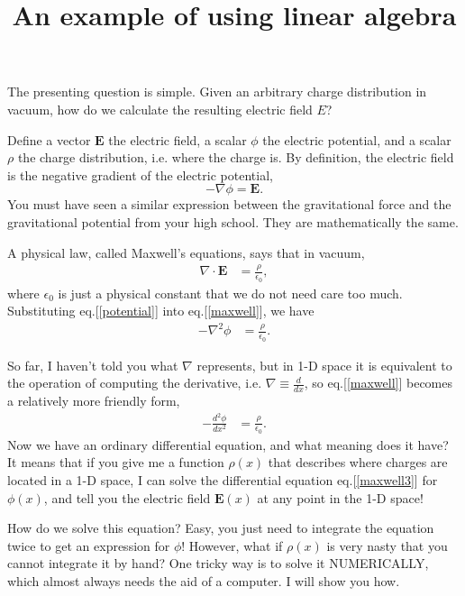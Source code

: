 \documentclass[paper=a4,fontsize=11pt]{scrartcl} %
\title{An example of using linear algebra}
\begin{document}
\maketitle

The presenting question is simple. Given an arbitrary charge distribution in vacuum, how do we calculate the resulting electric field $E$?

Define a vector $\mathbf{E}$ the electric field, a scalar $\phi$ the electric potential, and a scalar $\rho$ the charge distribution, i.e. where the charge is. By definition, the electric field is the negative gradient of the electric potential,
\begin{equation}\label{potential}
-\nabla \phi = \mathbf{E}.
\end{equation}
You must have seen a similar expression between the gravitational force and the gravitational potential from your high school. They are mathematically the same. 

A physical law, called Maxwell's equations, says that in vacuum,
\begin{align} \label{maxwell}
    \nabla\cdot\mathbf{E} &= \frac{\rho}{\epsilon_0},
\end{align}
where $\epsilon_0$ is just a physical constant that we do not need care too much. Substituting eq.[\ref{potential}] into eq.[\ref{maxwell}], we have
\begin{align}\label{maxwell2}
    -\nabla^2 \phi &= \frac{\rho}{\epsilon_0}.
\end{align}

So far, I haven't told you what $\nabla$ represents, but in 1-D space it is equivalent to the operation of computing the derivative, i.e. $\nabla\equiv\frac{d}{dx}$, so eq.[\ref{maxwell}] becomes a relatively more friendly form,
\begin{align} \label{maxwell3}
-\frac{d^2\phi}{dx^2} &= \frac{\rho}{\epsilon_0}.
\end{align}
Now we have an ordinary differential equation, and what meaning does it have? It means that if you give me a function $\rho(x)$ that describes where charges are located in a 1-D space, I can solve the differential equation eq.[\ref{maxwell3}] for $\phi(x)$, and tell you the electric field $\mathbf{E}(x)$ at any point in the 1-D space!

How do we solve this equation? Easy, you just need to integrate the equation twice to get an expression for $\phi$! However, what if $\rho(x)$ is very nasty that you cannot integrate it by hand? One tricky way is to solve it NUMERICALLY, which almost always needs the aid of a computer. I will show you how.
\end{document}
